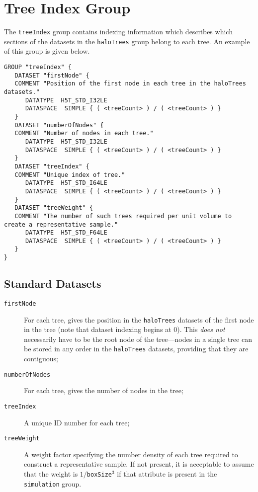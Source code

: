 \section{Tree Index Group}

The {\tt treeIndex} group contains indexing information which describes which sections of the datasets in the {\tt haloTrees} group belong to each tree. An example of this group is given below.

\begin{verbatim}
GROUP "treeIndex" {
   DATASET "firstNode" {
   COMMENT "Position of the first node in each tree in the haloTrees datasets."
      DATATYPE  H5T_STD_I32LE
      DATASPACE  SIMPLE { ( <treeCount> ) / ( <treeCount> ) }
   }
   DATASET "numberOfNodes" {
   COMMENT "Number of nodes in each tree."
      DATATYPE  H5T_STD_I32LE
      DATASPACE  SIMPLE { ( <treeCount> ) / ( <treeCount> ) }
   }
   DATASET "treeIndex" {
   COMMENT "Unique index of tree."
      DATATYPE  H5T_STD_I64LE
      DATASPACE  SIMPLE { ( <treeCount> ) / ( <treeCount> ) }
   }
   DATASET "treeWeight" {
   COMMENT "The number of such trees required per unit volume to create a representative sample."
      DATATYPE  H5T_STD_F64LE
      DATASPACE  SIMPLE { ( <treeCount> ) / ( <treeCount> ) }
   }
}
\end{verbatim}

\subsection{Standard Datasets}

\begin{description}
 \item [{\tt firstNode}] For each tree, gives the position in the {\tt haloTrees} datasets of the first node in the tree (note that dataset indexing begins at 0). This \emph{does not} necessarily have to be the root node of the tree---nodes in a single tree can be stored in any order in the {\tt haloTrees} datasets, providing that they are contiguous;
 \item [{\tt numberOfNodes}] For each tree, gives the number of nodes in the tree;
 \item [{\tt treeIndex}] A unique ID number for each tree;
 \item [{\tt treeWeight}] A weight factor specifying the number density of each tree required to construct a representative sample. If not present, it is acceptable to assume that the weight is $1/${\tt boxSize}$^3$ if that attribute is present in the {\tt simulation} group.
\end{description}

